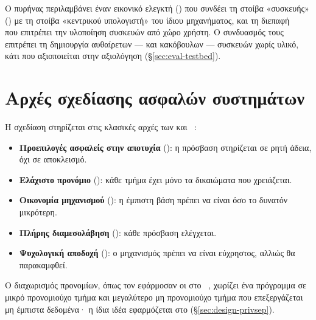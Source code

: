 Ο πυρήνας περιλαμβάνει έναν εικονικό ελεγκτή () που συνδέει τη
στοίβα «συσκευής» () με τη στοίβα «κεντρικού υπολογιστή» του ίδιου
μηχανήματος, και τη διεπαφή ~\cite{kernel-raw-gadget} που
επιτρέπει την υλοποίηση συσκευών  από χώρο χρήστη. Ο συνδυασμός τους
επιτρέπει τη δημιουργία αυθαίρετων — και κακόβουλων — συσκευών  χωρίς
υλικό, κάτι που αξιοποιείται στην αξιολόγηση (§\ref{sec:eval-testbed}).

\section{Αρχές σχεδίασης ασφαλών συστημάτων}
\label{sec:principles}

Η σχεδίαση στηρίζεται στις κλασικές αρχές των  και
~\cite{saltzer1975protection}:

\begin{itemize}
  \item \textbf{Προεπιλογές ασφαλείς στην αποτυχία} ():
        η πρόσβαση στηρίζεται σε ρητή άδεια, όχι σε αποκλεισμό.
  \item \textbf{Ελάχιστο προνόμιο} (): κάθε τμήμα έχει μόνο
        τα δικαιώματα που χρειάζεται.
  \item \textbf{Οικονομία μηχανισμού} (): η έμπιστη
        βάση πρέπει να είναι όσο το δυνατόν μικρότερη.
  \item \textbf{Πλήρης διαμεσολάβηση} (): κάθε πρόσβαση
        ελέγχεται.
  \item \textbf{Ψυχολογική αποδοχή} (): ο
        μηχανισμός πρέπει να είναι εύχρηστος, αλλιώς θα παρακαμφθεί.
\end{itemize}

Ο διαχωρισμός προνομίων, όπως τον εφάρμοσαν οι  στο
~\cite{provos2003privsep}, χωρίζει ένα πρόγραμμα σε μικρό
προνομιούχο τμήμα και μεγαλύτερο μη προνομιούχο τμήμα που επεξεργάζεται μη
έμπιστα δεδομένα· η ίδια ιδέα εφαρμόζεται στο \Probolos{} (§\ref{sec:design-privsep}).
